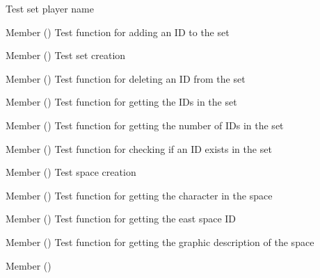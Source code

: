 \begin{DoxyRefList}
%
Test set player name  
\item[Member \doxylink{set__test_8h_ab09827322a313bf97b9757c98c2bdbb0}{test2\+\_\+set\+\_\+add} ()]\label{test__test000108}%
%
Test function for adding an ID to the set  
\item[Member \doxylink{set__test_8h_abed3d273788e23fc31ae7f5ed59277b9}{test2\+\_\+set\+\_\+create} ()]\label{test__test000106}%
%
Test set creation  
\item[Member \doxylink{set__test_8h_a4e8b8663f067122ea82b83e2d07e685c}{test2\+\_\+set\+\_\+del} ()]\label{test__test000110}%
%
Test function for deleting an ID from the set  
\item[Member \doxylink{set__test_8h_aafec36ceb79db74e67643606bf07c401}{test2\+\_\+set\+\_\+get\+\_\+ids} ()]\label{test__test000117}%
%
Test function for getting the IDs in the set  
\item[Member \doxylink{set__test_8h_ad5a91905fcc8293d737c2eb127564976}{test2\+\_\+set\+\_\+get\+\_\+nids} ()]\label{test__test000112}%
%
Test function for getting the number of IDs in the set  
\item[Member \doxylink{set__test_8h_a4c54c48958cc62ded17b9a9c0f02489c}{test2\+\_\+set\+\_\+id\+\_\+is\+\_\+there} ()]\label{test__test000115}%
%
Test function for checking if an ID exists in the set  
\item[Member \doxylink{space__test_8h_a012cd3cf37a8d91e2d7098a264c29d65}{test2\+\_\+space\+\_\+create} ()]\label{test__test000119}%
%
Test space creation  
\item[Member \doxylink{space__test_8h_a265ce3822740dbbd82b847437ff415ea}{test2\+\_\+space\+\_\+get\+\_\+character} ()]\label{test__test000152}%
%
Test function for getting the character in the space  
\item[Member \doxylink{space__test_8h_a249293510e61c6d5465f52c14343d02b}{test2\+\_\+space\+\_\+get\+\_\+east} ()]\label{test__test000146}%
%
Test function for getting the east space ID  
\item[Member \doxylink{space__test_8h_a3422f19fd8a821a06ccba2feb52034c2}{test2\+\_\+space\+\_\+get\+\_\+gdesc} ()]\label{test__test000154}%
%
Test function for getting the graphic description of the space  
\item[Member \doxylink{space__test_8h_af9087176b0d3c41d83a17a4918b13e31}{test2\+\_\+space\+\_\+get\+\_\+id} ()]\label{test__test000138}%

\end{DoxyRefList}
